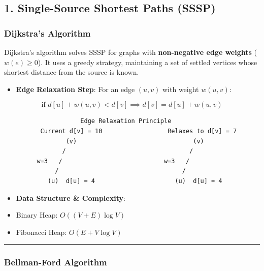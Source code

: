 \documentclass[
]{book}
\providecommand{\tightlist}{%
  \setlength{\itemsep}{0pt}\setlength{\parskip}{0pt}}
\theoremstyle{definition}
\theoremstyle{definition}
\theoremstyle{definition}
\theoremstyle{definition}
\theoremstyle{remark}
\begin{document}
\subsection{1. Single-Source Shortest Paths (SSSP)}\label{single-source-shortest-paths-sssp}

\subsubsection{Dijkstra's Algorithm}\label{dijkstras-algorithm}

Dijkstra's algorithm solves SSSP for graphs with \textbf{non-negative edge weights} (\(w(e) \ge 0\)). It uses a greedy strategy, maintaining a set of settled vertices whose shortest distance from the source is known.

\begin{itemize}
\tightlist
\item
  \textbf{Edge Relaxation Step}: For an edge \((u, v)\) with weight \(w(u, v)\):
\end{itemize}

\[\text{if } d[u] + w(u, v) < d[v] \implies d[v] = d[u] + w(u, v)\]

\begin{verbatim}
                     Edge Relaxation Principle
          Current d[v] = 10                  Relaxes to d[v] = 7
                 (v)                                (v)
                /                                  /
         w=3   /                            w=3   /
              /                                  /
            (u)  d[u] = 4                      (u)  d[u] = 4
\end{verbatim}

\begin{itemize}
\tightlist
\item
  \textbf{Data Structure \& Complexity}:
\item
  Binary Heap: \(O((V + E) \log V)\)
\item
  Fibonacci Heap: \(O(E + V \log V)\)
\end{itemize}

\begin{center}\rule{0.5\linewidth}{0.5pt}\end{center}

\subsubsection{Bellman-Ford Algorithm}\label{bellman-ford-algorithm}
\end{document}
